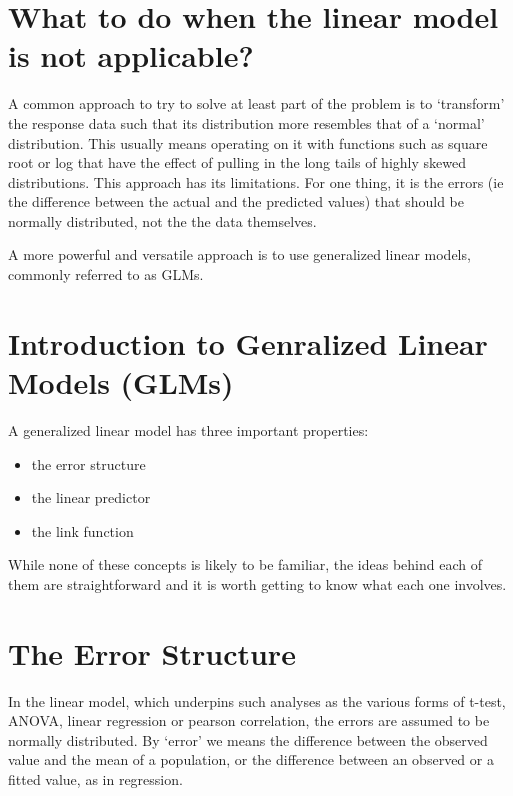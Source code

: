 \documentclass[
  letterpaper,
  DIV=11,
  numbers=noendperiod]{scrreprt}
\providecommand{\tightlist}{%
  \setlength{\itemsep}{0pt}\setlength{\parskip}{0pt}}\usepackage{longtable,booktabs,array}
\begin{document}
\section{What to do when the linear model is not
applicable?}\label{what-to-do-when-the-linear-model-is-not-applicable}

A common approach to try to solve at least part of the problem is to
`transform' the response data such that its distribution more resembles
that of a `normal' distribution. This usually means operating on it with
functions such as square root or log that have the effect of pulling in
the long tails of highly skewed distributions. This approach has its
limitations. For one thing, it is the errors (ie the difference between
the actual and the predicted values) that should be normally
distributed, not the the data themselves.

A more powerful and versatile approach is to use generalized linear
models, commonly referred to as GLMs.

\section{Introduction to Genralized Linear Models
(GLMs)}\label{introduction-to-genralized-linear-models-glms}

A generalized linear model has three important properties:

\begin{itemize}
\tightlist
\item
  the error structure
\item
  the linear predictor
\item
  the link function
\end{itemize}

While none of these concepts is likely to be familiar, the ideas behind
each of them are straightforward and it is worth getting to know what
each one involves.

\section{The Error Structure}\label{the-error-structure}

In the linear model, which underpins such analyses as the various forms
of t-test, ANOVA, linear regression or pearson correlation, the errors
are assumed to be normally distributed. By `error' we means the
difference between the observed value and the mean of a population, or
the difference between an observed or a fitted value, as in regression.
\end{document}
